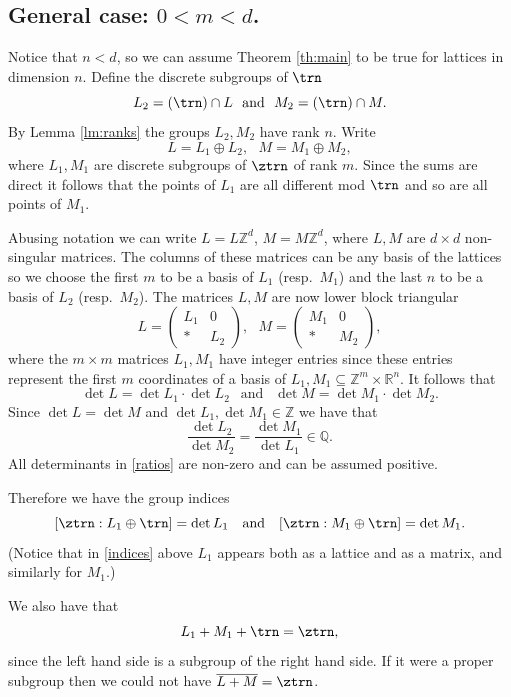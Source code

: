 \documentclass[12pt,a4paper,oneside]{amsart}
\theoremstyle{plain}
\theoremstyle{definition}
\newcommand{\RR}{{\mathbb R}}
\newcommand{\ZZ}{{\mathbb Z}}
\newcommand{\QQ}{{\mathbb Q}}
\newcounter{rem}
\begin{document}
\subsection{General case: $0 < m < d$.}\label{ss:general} {Notice that $n<d$, so we can assume Theorem \ref{th:main} to be true for lattices in dimension $n$.} Define the discrete subgroups of $\trn$
$$
L_2 = (\trn) \cap L \ \text{ and } \ M_2 = (\trn) \cap M.
$$
By Lemma \ref{lm:ranks} the groups $L_2, M_2$ have rank $n$.
Write
$$
L = L_1\oplus L_2,\ \ \ M=M_1\oplus M_2,
$$
where $L_1, M_1$ are discrete subgroups of $\ztrn$ of rank $m$.
Since the sums are direct it follows that the points of $L_1$ are all different mod $\trn$ and so are all points of $M_1$.



Abusing notation we can write $L = L\ZZ^d$, $M=M\ZZ^d$, where $L, M$ are $d\times d$ non-singular matrices. The columns of these matrices can be any basis of the lattices so we choose the first $m$ to be a basis of $L_1$ (resp.\ $M_1$) and the last $n$ to be a basis of $L_2$ (resp.\ $M_2$). The matrices $L, M$ are now lower block triangular
$$
L = \begin{pmatrix}
L_1 & 0 \\ * & L_2
\end{pmatrix},\ \ \ 
M = \begin{pmatrix}
M_1 & 0 \\ * & M_2
\end{pmatrix},
$$
where the $m\times m$ matrices $L_1, M_1$ have integer entries since these entries represent the first $m$ coordinates of a basis of $L_1, M_1 \subseteq \ZZ^m\times\RR^n$. It follows that
$$
\det L = \det L_1 \cdot \det L_2 \ \ \text{ and }\ \ 
\det M = \det M_1 \cdot \det M_2.
$$
Since $\det L = \det M$ and $\det L_1, \det M_1 \in \ZZ$ we have that
\begin{equation}\label{ratios}
\frac{\det L_2}{\det M_2} = \frac{\det M_1}{\det L_1} \in \QQ.
\end{equation}
All determinants in \eqref{ratios} are non-zero and can be assumed positive.


Therefore we have the group indices
\begin{equation}\label{indices}
	[\ztrn : L_1\oplus\trn] = \det L_1 \ \ \text{ and }\ \ 
	[\ztrn : M_1\oplus\trn] = \det M_1.
\end{equation}
{(Notice that in \eqref{indices} above $L_1$ appears both as a lattice and as a matrix, and similarly for $M_1$.)}

We also have that
\begin{equation}\label{l1m1}
	L_1+M_1+\trn = \ztrn,
\end{equation}
since the left hand side is a subgroup of the right hand side. If it were a proper subgroup then we could not have $\overline{L+M}=\ztrn$.
\end{document}
